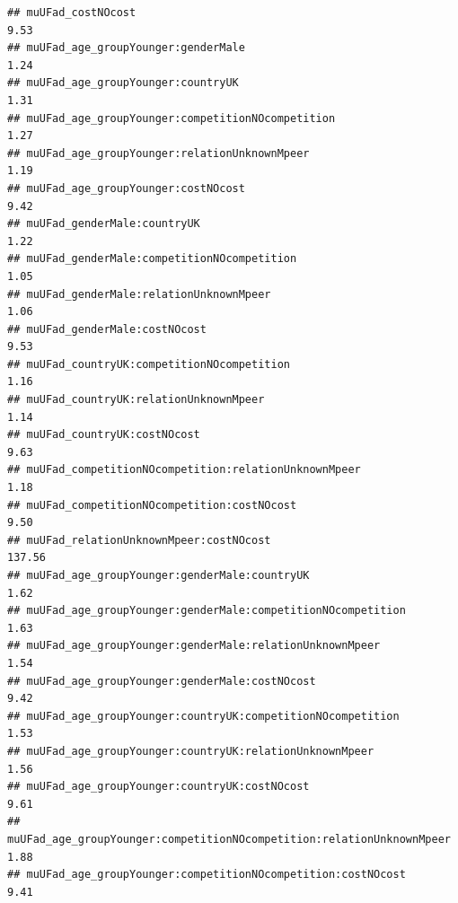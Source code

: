 \documentclass[
]{article}
\begin{document}
\begin{verbatim}
## muUFad_costNOcost                                                                                 9.53
## muUFad_age_groupYounger:genderMale                                                                1.24
## muUFad_age_groupYounger:countryUK                                                                 1.31
## muUFad_age_groupYounger:competitionNOcompetition                                                  1.27
## muUFad_age_groupYounger:relationUnknownMpeer                                                      1.19
## muUFad_age_groupYounger:costNOcost                                                                9.42
## muUFad_genderMale:countryUK                                                                       1.22
## muUFad_genderMale:competitionNOcompetition                                                        1.05
## muUFad_genderMale:relationUnknownMpeer                                                            1.06
## muUFad_genderMale:costNOcost                                                                      9.53
## muUFad_countryUK:competitionNOcompetition                                                         1.16
## muUFad_countryUK:relationUnknownMpeer                                                             1.14
## muUFad_countryUK:costNOcost                                                                       9.63
## muUFad_competitionNOcompetition:relationUnknownMpeer                                              1.18
## muUFad_competitionNOcompetition:costNOcost                                                        9.50
## muUFad_relationUnknownMpeer:costNOcost                                                          137.56
## muUFad_age_groupYounger:genderMale:countryUK                                                      1.62
## muUFad_age_groupYounger:genderMale:competitionNOcompetition                                       1.63
## muUFad_age_groupYounger:genderMale:relationUnknownMpeer                                           1.54
## muUFad_age_groupYounger:genderMale:costNOcost                                                     9.42
## muUFad_age_groupYounger:countryUK:competitionNOcompetition                                        1.53
## muUFad_age_groupYounger:countryUK:relationUnknownMpeer                                            1.56
## muUFad_age_groupYounger:countryUK:costNOcost                                                      9.61
## muUFad_age_groupYounger:competitionNOcompetition:relationUnknownMpeer                             1.88
## muUFad_age_groupYounger:competitionNOcompetition:costNOcost                                       9.41

\end{verbatim}
\end{document}
